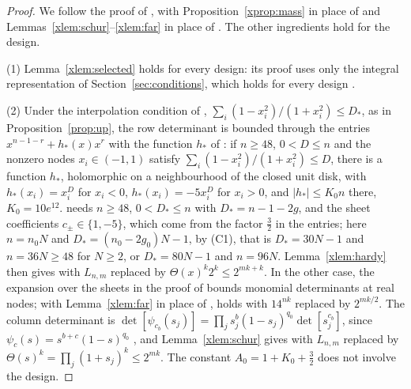 \documentclass[11pt]{article}
\theoremstyle{definition}
\begin{document}
\begin{proof}
We follow the proof of \cite[Theorem~6.3]{Jha}, with Proposition~\ref{xprop:mass} in place of \cite[Proposition~5.4]{Jha} and Lemmas~\ref{xlem:schur}--\ref{xlem:far} in place of \cite[Lemmas~4.1, 4.5, Corollary~4.2]{Jha}. The other ingredients hold for the design.

(1) Lemma~\ref{xlem:selected} holds for every design: its proof uses only the integral representation of Section~\ref{sec:conditions}, which holds for every design \cite[Sec.~5.1]{OAI}.

(2) Under the interpolation condition of \cite[Lemma~6.2]{Jha}, $\sum_i(1-x_i^2)/(1+x_i^2)\le D_*$, as in Proposition~\ref{prop:up}, the row determinant is bounded through the entries $x^{n-1-r}+h_*(x)x^r$ with the function $h_*$ of \cite[Lemma~4.3]{Jha}: if $n\ge48$, $0<D\le n$ and the nonzero nodes $x_i\in(-1,1)$ satisfy $\sum_i(1-x_i^2)/(1+x_i^2)\le D$, there is a function $h_*$, holomorphic on a neighbourhood of the closed unit disk, with $h_*(x_i)=x_i^D$ for $x_i<0$, $h_*(x_i)=-5x_i^D$ for $x_i>0$, and $|h_*|\le K_0n$ there, $K_0=10e^{12}$. \cite[Lemma~4.3]{Jha} needs $n\ge48$, $0<D_*\le n$ with $D_*=n-1-2g$, and the sheet coefficients $c_\pm\in\{1,-5\}$, which come from the factor $\frac32$ in the entries; here $n=n_0N$ and $D_*=(n_0-2g_0)N-1$, by (C1), that is $D_*=30N-1$ and $n=36N\ge48$ for $N\ge2$, or $D_*=80N-1$ and $n=96N$. Lemma~\ref{xlem:hardy} then gives \cite[(6.5)]{Jha} with $L_{n,m}$ replaced by $\Theta(x)^k2^k\le2^{mk+k}$. In the other case, the expansion over the sheets in the proof of \cite[Lemma~6.2]{Jha} bounds monomial determinants at real nodes; with Lemma~\ref{xlem:far} in place of \cite[Lemma~4.5]{Jha}, \cite[(6.6)]{Jha} holds with $14^{nk}$ replaced by $2^{mk/2}$. The column determinant is $\det[\psi_{c_b}(s_j)]=\prod_js_j^b(1-s_j)^{q_0}\det[s_j^{c_b}]$, since $\psi_c(s)=s^{b+c}(1-s)^{q_0}$ \cite[(2.11)]{Jha}, and Lemma~\ref{xlem:schur} gives \cite[(6.7)]{Jha} with $L_{n,m}$ replaced by $\Theta(s)^k=\prod_j(1+s_j)^k\le2^{mk}$. The constant $A_0=1+K_0+\frac32$ does not involve the design.


\end{proof}
\end{document}
